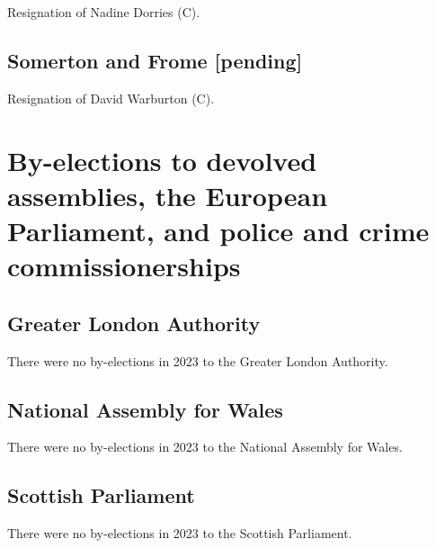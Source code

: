 \documentclass[a4paper,openany]{book}
\begin{document}
Resignation of Nadine Dorries (C).

\section*{Somerton and Frome \hspace*{\fill}\nolinebreak[1]%
	\enspace\hspace*{\fill}
	[pending]}


Resignation of David Warburton (C).

\chapter{By-elections to devolved assemblies, the European Parliament, and police and crime commissionerships}

\section{Greater London Authority}

There were no by-elections in 2023 to the Greater London Authority.


\section{National Assembly for Wales}

There were no by-elections in 2023 to the National Assembly for Wales.


\section{Scottish Parliament}

There were no by-elections in 2023 to the Scottish Parliament.
\end{document}
